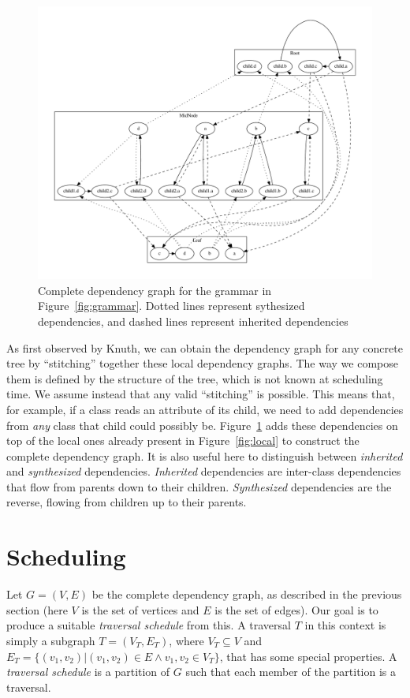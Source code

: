 \documentclass[10pt]{article}
\begin{document}
\begin{figure}[h]
    \begin{center}
        \includegraphics[scale=0.3]{complete}
    \end{center}
    \caption{Complete dependency graph for the grammar in Figure~\ref{fig:grammar}. Dotted lines represent sythesized dependencies, and dashed lines represent inherited dependencies}
    \label{fig:complete}
\end{figure}

As first observed by Knuth, we can obtain the dependency graph for any concrete tree by ``stitching'' together these local dependency graphs. The way we compose them is defined by the structure of the tree, which is not known at scheduling time. We assume instead that any valid ``stitching'' is possible. This means that, for example, if a class reads an attribute of its child, we need to add dependencies from \emph{any} class that child could possibly be. Figure~\ref{fig:complete}
adds these dependencies on top of the local ones already present in Figure~\ref{fig:local} to construct the complete dependency graph. It is also useful here to distinguish between \emph{inherited} and \emph{synthesized} dependencies. \emph{Inherited} dependencies are inter-class dependencies that flow from parents down to their children. \emph{Synthesized} dependencies are the reverse, flowing from children up to their parents.

\section{Scheduling}
Let $G = (V, E)$ be the complete dependency graph, as described in the previous section (here $V$ is the set of vertices and $E$ is the set of edges). Our goal is to produce a suitable \emph{traversal schedule} from this. A traversal $T$ in this context is simply a subgraph $T = (V_T, E_T)$, where $ V_T \subseteq V$ and $ E_T = \{(v_1,v_2) | (v_1, v_2) \in E \wedge  v_1,v_2 \in V_T\}$, that has some special properties. A \emph{traversal schedule} is a partition of $G$ such that each member of the
partition is a traversal.
\end{document}
